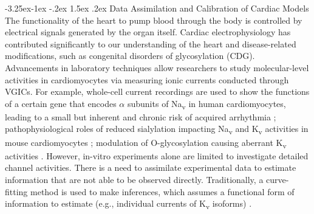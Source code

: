 \documentclass[11pt]{article}
\makeatletter
\renewcommand\subsection{\@startsection{subsection}{2}{\z@}%
                                     {-3.25ex\@plus -1ex \@minus -.2ex}%
                                     {1.5ex \@plus .2ex}%
                                     {\normalfont\fontfamily{phv}\fontsize{14}{17}\bfseries}}
\makeatother
\begin{document}
\subsection{Data Assimilation and Calibration of Cardiac Models}
The functionality of the heart to pump blood through the body is controlled by electrical signals generated by the organ itself. Cardiac electrophysiology has contributed significantly to our understanding of the heart and disease-related modifications, such as congenital disorders of glycosylation (CDG). Advancements in laboratory techniques allow researchers to study molecular-level activities in cardiomyocytes via measuring ionic currents conducted through VGICs. For example, whole-cell current recordings are used to show the functions of a certain gene that encodes $\alpha$ subunits of Na\textsubscript{v} in human cardiomyocytes, leading to a small but inherent and chronic risk of acquired arrhythmia \citep{splawski2002variant}; pathophysiological roles of reduced sialylation impacting Na\textsubscript{v} and K\textsubscript{v} activities in mouse cardiomyocytes \citep{ednie2015sialicNav2,ednie2015sialicKv}; modulation of O-glycosylation causing aberrant K\textsubscript{v} activities \citep{schwetz2011sialic}. However, in-vitro experiments alone are limited to investigate detailed channel activities. There is a need to assimilate experimental data to estimate information that are not able to be observed directly. Traditionally, a curve-fitting method is used to make inferences, which assumes a functional form of information to estimate (e.g., individual currents of K\textsubscript{v} isoforms) \citep{liu2011dissection}.
\end{document}
